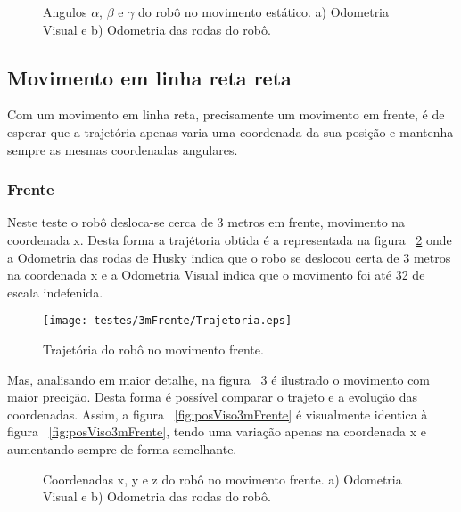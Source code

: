 \begin{figure}[!htbp]
	\centering
	\qquad
	\caption{Angulos $\alpha$, $\beta$ e $\gamma$ do robô no movimento estático. a) Odometria Visual e b) Odometria das rodas do robô.}
	\label{fig:angEst}
\end{figure}


\FloatBarrier
\subsection{Movimento em linha reta reta}\label{subsubsection:Linha}

Com um movimento em linha reta, precisamente um movimento em frente, é de esperar que a trajetória apenas varia uma coordenada da sua posição e mantenha sempre as mesmas coordenadas angulares.

\FloatBarrier
\subsubsection{Frente}\label{subsubsection:EmFrente}

Neste teste o robô desloca-se cerca de 3 metros em frente, movimento na coordenada x. 
Desta forma  a trajétoria obtida é a representada na figura ~\ref{fig:trajRobo3mFrente} onde a Odometria das rodas de Husky indica que o robo se deslocou certa de 3 metros na coordenada x e a Odometria Visual indica que o movimento foi até 32 de escala indefenida. 

\begin{figure}[h!]
	\begin{center}
		\leavevmode		
		\texttt{[image: testes/3mFrente/Trajetoria.eps]}
		\caption{Trajetória do robô no movimento frente.}
		\label{fig:trajRobo3mFrente}
	\end{center}
\end{figure}

Mas, analisando em maior detalhe, na figura ~\ref{fig:pos3mFrente} é ilustrado o movimento com maior precição. Desta forma é possível comparar o trajeto e a evolução das coordenadas. Assim, a figura  ~\ref{fig:posViso3mFrente} é visualmente identica à figura ~\ref{fig:posViso3mFrente}, tendo uma variação apenas na coordenada x e aumentando sempre de forma semelhante.


\begin{figure}[h!]
	\centering
	\qquad
	\caption{Coordenadas x, y e z do robô no movimento frente. a) Odometria Visual e b) Odometria das rodas do robô.}
	\label{fig:pos3mFrente}
\end{figure}


